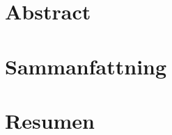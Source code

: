\documentclass[showtrims, oldfontcommands]{kthesis}
\begin{document}
%
\frontmatter
{}
%
\maketitle

%
\pagestyle{empty}

%
\clearpage

\cleardoublepage

%
% 


%
\cleardoublepage
{}
{}
\chapter*{Abstract}
\renewcommand{\abstractname}{\vspace{-\baselineskip}}
\begin{abstract}
    \label{abstract:thesis:en}

\end{abstract}
\clearpage

\cleardoublepage
{}
\chapter*{Sammanfattning}
\renewcommand{\abstractname}{\vspace{-\baselineskip}}
\begin{abstract}
    \label{abstract:thesis:sv}

\end{abstract}
\clearpage

\cleardoublepage
{}
\chapter*{Resumen}
\renewcommand{\abstractname}{\vspace{-\baselineskip}}
\begin{abstract}
    \label{abstract:thesis:es}

\end{abstract}
\clearpage
\end{document}
